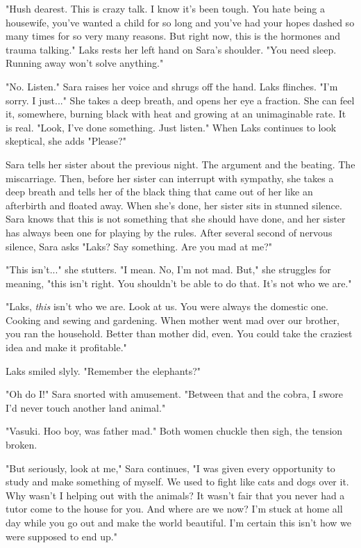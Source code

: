 \documentclass{article}
\begin{document}
"Hush dearest. This is crazy talk. I know it’s been tough. You hate being a housewife, you've wanted a child for so long and you've had your hopes dashed so many times for so very many reasons. But right now, this is the hormones and trauma talking." Laks rests her left hand on Sara's shoulder. "You need sleep. Running away won't solve anything."

"No. Listen." Sara raises her voice and shrugs off the hand. Laks flinches. "I'm sorry. I just..." She takes a deep breath, and opens her eye a fraction. She can feel it, somewhere, burning black with heat and growing at an unimaginable rate. It is real. "Look, I've done something. Just listen." When Laks continues to look skeptical, she adds "Please?"

Sara tells her sister about the previous night. The argument and the beating. The miscarriage. Then, before her sister can interrupt with sympathy, she takes a deep breath and tells her of the black thing that came out of her like an afterbirth and floated away. When she's done, her sister sits in stunned silence. Sara knows that this is not something that she should have done, and her sister has always been one for playing by the rules. After several second of nervous silence, Sara asks "Laks? Say something. Are you mad at me?"

"This isn't..." she stutters. "I mean. No, I'm not mad. But," she struggles for meaning, "this isn't right. You shouldn't be able to do that. It’s not who we are."

"Laks, \emph{this} isn't who we are. Look at us. You were always the domestic one. Cooking and sewing and gardening. When mother went mad over our brother, you ran the household. Better than mother did, even. You could take the craziest idea and make it profitable." 

Laks smiled slyly. "Remember the elephants?"

"Oh do I!" Sara snorted with amusement. "Between that and the cobra, I swore I'd never touch another land animal." 

"Vasuki. Hoo boy, was father mad." Both women chuckle then sigh, the tension broken.

"But seriously, look at me," Sara continues, "I was given every opportunity to study and make something of myself. We used to fight like cats and dogs over it. Why wasn't I helping out with the animals? It wasn't fair that you never had a tutor come to the house for you. And where are we now? I'm stuck at home all day while you go out and make the world beautiful. I'm certain this isn't how we were supposed to end up."
\end{document}

